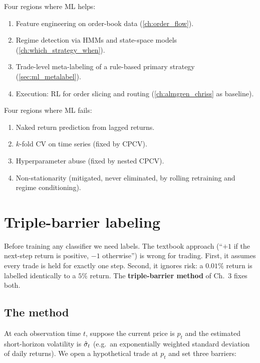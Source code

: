 \begin{keyfactbox}
Four regions where ML helps:
\begin{enumerate}
  \item Feature engineering on order-book data
  (\cref{ch:order_flow}).
  \item Regime detection via HMMs and state-space models
  (\cref{ch:which_strategy_when}).
  \item Trade-level meta-labeling of a rule-based primary
  strategy (\cref{sec:ml_metalabel}).
  \item Execution: RL for order slicing and routing
  (\cref{ch:almgren_chriss} as baseline).
\end{enumerate}
Four regions where ML fails:
\begin{enumerate}
  \item Naked return prediction from lagged returns.
  \item $k$-fold CV on time series (fixed by CPCV).
  \item Hyperparameter abuse (fixed by nested CPCV).
  \item Non-stationarity (mitigated, never eliminated, by
  rolling retraining and regime conditioning).
\end{enumerate}
\end{keyfactbox}

\section{Triple-barrier labeling}
\label{sec:ml_triple_barrier}

Before training any classifier we need labels. The textbook
approach (``$+1$ if the next-step return is positive, $-1$
otherwise'') is wrong for trading. First, it assumes every
trade is held for exactly one step. Second, it ignores risk: a
$0.01\%$ return is labelled identically to a $5\%$ return. The
\textbf{triple-barrier method} of \citeAFML{} Ch.~3 fixes both.

\subsection{The method}
\label{subsec:ml_tb_method}

At each observation time $t$, suppose the current price is
$p_t$ and the estimated short-horizon volatility is $\hat{\sigma}_t$
(e.g.\ an exponentially weighted standard deviation of daily
returns). We open a hypothetical trade at $p_t$ and set three
barriers:

